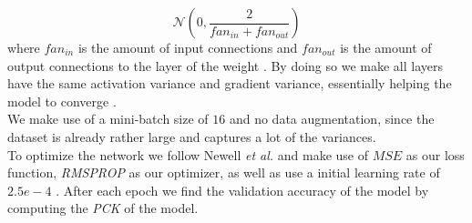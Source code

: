 \documentclass[./main.tex]{subfiles}
\begin{document}
$$\mathcal{N} \left(0, \frac{2}{fan_{in} + fan_{out}} \right)$$
where $fan_{in}$ is the amount of input connections and $fan_{out}$ is the amount of output connections to the layer of the weight \cite{Xavier}. By doing so we make all layers have the same activation variance and gradient variance, essentially helping the model to converge \cite{DeepLearning}. \\
We make use of a mini-batch size of $16$ and no data augmentation, since the dataset is already rather large and captures a lot of the variances. \\
To optimize the network we follow Newell \textit{et al.} and make use of $MSE$ as our loss function, \textit{RMSPROP} as our optimizer, as well as use a initial learning rate of $2.5e-4$ \cite{Newell}. After each epoch we find the validation accuracy of the model by computing the \textit{PCK} of the model.
\end{document}
